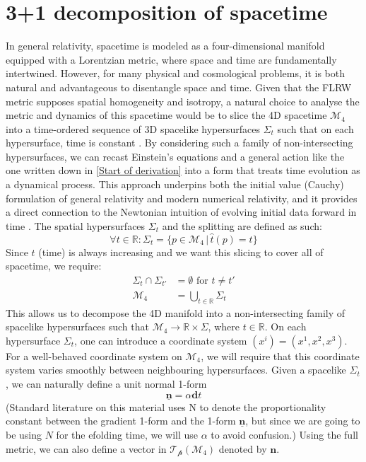 \documentclass[aps,prd,reprint,preprintnumbers,showpacs,floatfix,nofootinbib,superscript address]{revtex4-2}
\begin{document}
\section{3+1 decomposition of spacetime} \label{3+1 decomposition of spacetime}
In general relativity, spacetime is modeled as a four-dimensional manifold equipped with a Lorentzian metric, where space and time are fundamentally intertwined. However, for many physical and cosmological problems, it is both natural and advantageous to disentangle space and time. Given that the FLRW metric supposes spatial homogeneity and isotropy, a natural choice to analyse the metric and dynamics of this spacetime would be to slice the 4D spacetime $\mathcal{M}_4$ into a time-ordered sequence of 3D spacelike hypersurfaces $\Sigma_t$ such that on each hypersurface, time is constant \cite{baumann2012tasilecturesinflation, gourgoulhon_31_2007}. By considering such a family of non-intersecting hypersurfaces, we can recast Einstein's equations and a general action like the one written down in \cref{Start of derivation} into a form that treats time evolution as a dynamical process. This approach underpins both the initial value (Cauchy) formulation of general relativity and modern numerical relativity, and it provides a direct connection to the Newtonian intuition of evolving initial data forward in time \cite{choquet-bruhat_global_1969}. The spatial hypersurfaces $\Sigma_t$ and the splitting are defined as such:
\begin{equation}
    \forall t \in \mathbb{R} : \Sigma_t = \{p \in \mathcal{M}_4 \, | \, \hat{t} (p) = t\} \nonumber
\end{equation}
Since $t$ (time) is always increasing and we want this slicing to cover all of spacetime, we require:
\begin{align}
    \Sigma_t \cap \Sigma_{t'} &= \emptyset \,\, \text{for}\,\, t \neq t' \nonumber \\
    \mathcal{M}_4 &= \bigcup_{t \in \mathbb{R}} \Sigma_t \nonumber
\end{align}
This allows us to decompose the 4D manifold into a non-intersecting family of spacelike hypersurfaces such that $\mathcal{M}_4 \rightarrow \mathbb{R} \times \Sigma$, where $t \in \mathbb{R}$. On each hypersurface $\Sigma_t$, one can introduce a coordinate system $(x^i) = (x^1,x^2,x^3)$. For a well-behaved coordinate system on $\mathcal{M}_4$, we will require that this coordinate system varies smoothly between neighbouring hypersurfaces. Given a spacelike $\Sigma_t$, we can naturally define a unit normal 1-form 
\begin{equation} \label{unit 1-form}
    \underline{\bm{n}} =  \alpha \textbf{d}t    
\end{equation}
(Standard literature on this material uses N to denote the proportionality constant between the gradient 1-form and the 1-form $\underline{\bm{n}}$, but since we are going to be using $N$ for the efolding time, we will use $\alpha$ to avoid confusion.) Using the full metric, we can also define a vector in $\mathcal{T_p}(\mathcal{M}_4)$ denoted by $\bm{n}$.
\end{document}
